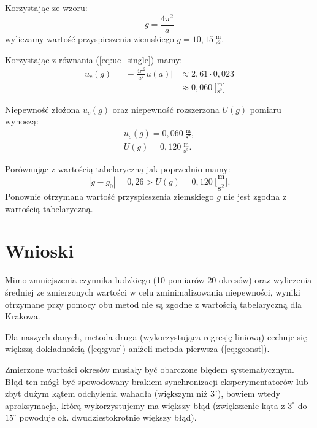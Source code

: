 \documentclass[12pt,a4paper]{article}
\numberwithin{equation}{section}
\begin{document}
\pagebreak
Korzystając ze wzoru:
\begin{equation}
	g = \frac{4\pi^2}{a}
\end{equation}
wyliczamy wartość przyspieszenia ziemskiego $g = 10,15~\frac{\textrm{m}}{\textrm{s}^2}$.


Korzystając z równania (\ref{eq:uc_single}) mamy:
\begin{equation}
	\begin{split}
	u_c(g) = \Big|-\frac{4\pi^2}{a^2}u(a)\Big| & \approx 2,61 \cdot 0,023\\
		   & \approx 0,060~\Big[\frac{\textrm{m}}{\textrm{s}^2}\Big]
	\end{split}
\end{equation}

Niepewność złożona $u_c(g)$ oraz niepewność rozszerzona $U(g)$ pomiaru wynoszą:
\begin{align}
	u_c(g) = 0,060~\frac{\textrm{m}}{\textrm{s}^2}, \\
	U(g) = 0,120~\frac{\textrm{m}}{\textrm{s}^2}.
\end{align}

Porównując z wartością tabelaryczną jak poprzednio mamy:
\begin{equation}
	|g - g_0| = 0,26 > U(g) = 0,120~\Big[\frac{\textrm{m}}{\textrm{s}^2}\Big].
	\label{eq:gvar}
\end{equation}
Ponownie otrzymana wartość przyspieszenia ziemskiego $g$ nie jest zgodna z wartością tabelaryczną.
\section{Wnioski}
Mimo zmniejszenia czynnika ludzkiego (10 pomiarów 20 okresów) oraz wyliczenia średniej ze zmierzonych wartości w celu zminimalizowania niepewności, wyniki otrzymane przy pomocy obu metod nie są zgodne z wartością tabelaryczną dla Krakowa.

Dla naszych danych, metoda druga (wykorzystująca regresję liniową) cechuje się większą dokładnością (\ref{eq:gvar}) aniżeli metoda pierwsza (\ref{eq:gconst}).

Zmierzone wartości okresów musiały być obarczone błędem systematycznym. Błąd ten mógł być spowodowany brakiem synchronizacji eksperymentatorów lub zbyt dużym kątem odchylenia wahadła (większym niż $3^\circ$), bowiem wtedy aproksymacja, którą wykorzystujemy ma większy błąd (zwiększenie kąta z $3^\circ$ do $15^\circ$ powoduje ok. dwudziestokrotnie większy błąd).


\end{document}
